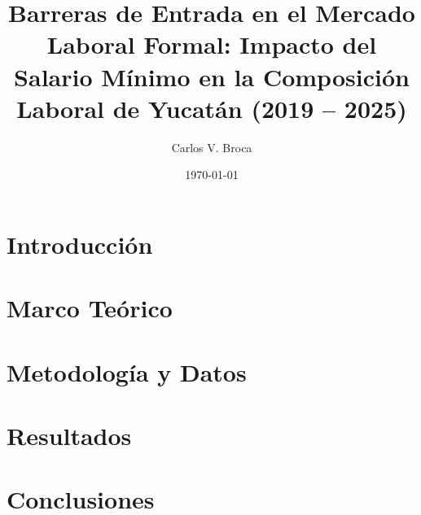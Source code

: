 \documentclass[12pt, letterpaper]{report}
\title{Barreras de Entrada en el Mercado Laboral Formal: Impacto del Salario Mínimo
en la Composición Laboral de Yucatán (2019 -- 2025)}
\author{Carlos V. Broca}
\date{\today}
\begin{document}
\maketitle
\tableofcontents

\chapter{Introducción}


\chapter{Marco Teórico}


\chapter{Metodología y Datos}


\chapter{Resultados}


\chapter{Conclusiones}




\end{document}
